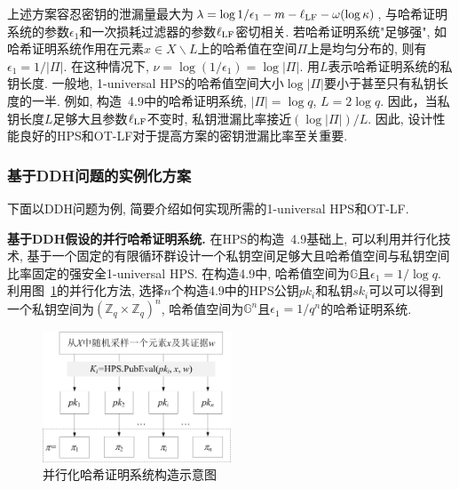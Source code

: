 \begin{note}
上述方案容忍密钥的泄漏量最大为$\lambda = \log 1/\epsilon_1 - m - \ell_{\text{LF}}-\omega(\log\kappa)$, 与哈希证明系统的参数$\epsilon_1$和一次损耗过滤器的参数$\ell_{\text{LF}}$密切相关. 若哈希证明系统"足够强", 如哈希证明系统作用在元素$x \in X \backslash L$上的哈希值在空间$\Pi$上是均匀分布的, 则有$\epsilon_1 = 1/|\Pi|$. 在这种情况下, $\nu = \log(1/\epsilon_1) = \log|\Pi|$. 用$L$表示哈希证明系统的私钥长度. 一般地, 1-universal HPS的哈希值空间大小$\log|\Pi|$要小于甚至只有私钥长度的一半. 例如, 构造~4.9中的哈希证明系统, $|\Pi| = \log q$, $L = 2\log q$. 因此，当私钥长度$L$足够大且参数$\ell_{\text{LF}}$不变时, 私钥泄漏比率接近$(\log|\Pi|)/L$. 因此, 设计性能良好的HPS和OT-LF对于提高方案的密钥泄漏比率至关重要.
\end{note}

\subsubsection{基于DDH问题的实例化方案}
下面以DDH问题为例, 简要介绍如何实现所需的1-universal HPS和OT-LF. 

\medskip\noindent\textbf{基于DDH假设的并行哈希证明系统.}  在HPS的构造~4.9基础上, 可以利用并行化技术, 基于一个固定的有限循环群设计一个私钥空间足够大且哈希值空间与私钥空间比率固定的强安全1-universal HPS. 在构造4.9中, 哈希值空间为$\mathbb{G}$且$\epsilon_1 = 1/\log q$. 利用图~\ref{figure:ParallelHPS}的并行化方法, 选择$n$个构造4.9中的HPS公钥$pk_i$和私钥$sk_i$可以可以得到一个私钥空间为$(\mathbb{Z}_q \times \mathbb{Z}_q)^n$, 哈希值空间为$\mathbb{G}^n$且$\epsilon_1 = 1/q^n$的哈希证明系统.
\begin{figure}[!hbtp]
\begin{center}
 \includegraphics[width=0.5\textwidth]{./figure/ParallelHPS.png}
\end{center}
\caption{并行化哈希证明系统构造示意图}\label{figure:ParallelHPS}
\end{figure}


